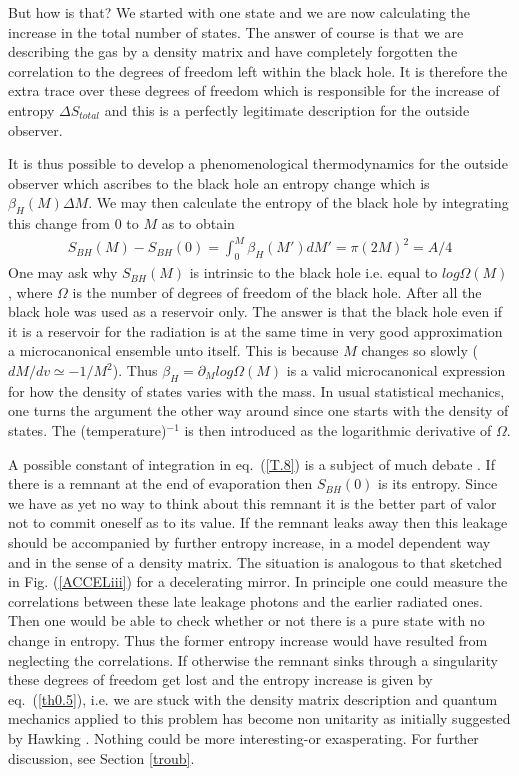 \documentclass[12pt,oneside]{report}
\begin{document}
But how is that? We started with one state and we are now
calculating the increase in the total number of states. The answer
of course is that we are describing the gas by a density matrix
and have completely forgotten the correlation to the degrees of
freedom left within the black hole. 
It is therefore the extra trace
over these degrees of freedom which is responsible for the
increase of entropy $ \Delta S_{total}$ and this is a perfectly
legitimate description for the outside observer. 

It is thus possible to develop a phenomenological thermodynamics
for the outside observer which ascribes to the black hole an
entropy change which is $ \beta_H (M) \Delta M$. 
We may then calculate the 
entropy of the black hole by integrating this change
from 0 to $M$ as to obtain
\begin{eqnarray}
S_{BH}(M) - S_{BH}(0) = \int_{0}^{M} \beta_H(M')
dM'= \pi (2M)^2 = A /4 \label {T.8}
\end{eqnarray}
One may ask why $S_{BH}(M)$ is intrinsic to the black hole i.e. equal to
$log \Omega (M)$, where $\Omega$ is the number of degrees of freedom of the
black hole. After all the black hole was used as a reservoir only.
The answer is that the black hole even if it is a reservoir for the radiation
is at the same time in very good approximation a microcanonical ensemble unto
itself. This is because $M$ changes so slowly ($dM/dv \simeq - 1/ M^2$).
Thus $\beta_H = \partial_M log \Omega (M)$ is a valid microcanonical
expression for how the density of states varies with the mass. In usual statistical
mechanics, one turns the argument the other way around since one starts with
the density of states. The (temperature)$^{-1}$ is then introduced as the
logarithmic derivative of $\Omega$.

A possible  constant of integration in eq.~(\ref{T.8}) is 
a subject of much
debate \cite{CaEn}. If there is 
a remnant at the end of evaporation then $ S_{B H}
(0)$ is its entropy. Since we have as yet no way to think about
this remnant it is the better part of valor not to commit oneself as to its
value. If the remnant leaks away  then this leakage should be accompanied by
further entropy increase, in a model dependent way and in the sense
of a density matrix. The situation is analogous to that sketched in
Fig. (\ref{ACCELiii}) for a decelerating mirror. In principle one could measure the
correlations between these late leakage photons and the earlier radiated
ones. Then one would be able to check whether or not
there is a pure state with no change
in entropy. Thus the former entropy increase would have resulted
from neglecting the correlations.
If otherwise the remnant sinks through a singularity
these degrees of freedom  get lost  and the entropy
increase is given by eq.~(\ref{th0.5}), i.e. we are stuck with the density
matrix description and quantum mechanics applied to this problem has
become non unitarity as initially suggested by Hawking  \cite{Hawk3}. 
Nothing could be more interesting-or exasperating.
For further discussion, see Section \ref{troub}.
\end{document}
